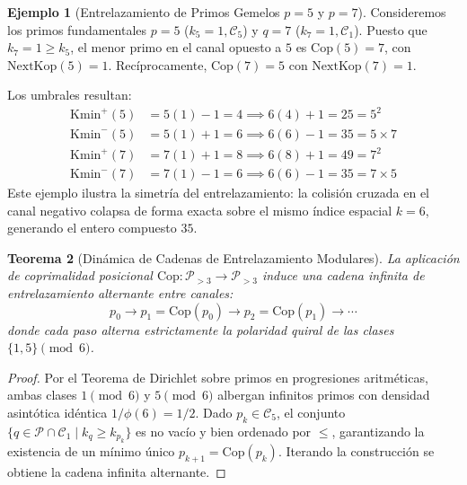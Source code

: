 \documentclass{article}
\numberwithin{equation}{section}
\theoremstyle{plain}
\newtheorem{theorem}{Teorema}[section]
\theoremstyle{definition}
\newtheorem{example}[theorem]{Ejemplo}
\begin{document}
\begin{example}[Entrelazamiento de Primos Gemelos $p=5$ y $p=7$]
Consideremos los primos fundamentales $p=5$ ($k_5 = 1, \mathcal{C}_5$) y $q=7$ ($k_7 = 1, \mathcal{C}_1$). 
Puesto que $k_7 = 1 \ge k_5$, el menor primo en el canal opuesto a $5$ es $\mathrm{Cop}(5) = 7$, con $\mathrm{NextKop}(5) = 1$. Recíprocamente, $\mathrm{Cop}(7) = 5$ con $\mathrm{NextKop}(7) = 1$.

Los umbrales resultan:
\begin{align}
\mathrm{Kmin}^+(5) &= 5(1) - 1 = 4 \implies 6(4) + 1 = 25 = 5^2 \nonumber \\
\mathrm{Kmin}^-(5) &= 5(1) + 1 = 6 \implies 6(6) - 1 = 35 = 5 \times 7 \nonumber \\
\mathrm{Kmin}^+(7) &= 7(1) + 1 = 8 \implies 6(8) + 1 = 49 = 7^2 \nonumber \\
\mathrm{Kmin}^-(7) &= 7(1) - 1 = 6 \implies 6(6) - 1 = 35 = 7 \times 5 \nonumber
\end{align}
Este ejemplo ilustra la simetría del entrelazamiento: la colisión cruzada en el canal negativo colapsa de forma exacta sobre el mismo índice espacial $k = 6$, generando el entero compuesto $35$.
\end{example}

\begin{theorem}[Dinámica de Cadenas de Entrelazamiento Modulares]
\label{thm:simetria-entrelazamiento}
La aplicación de coprimalidad posicional $\mathrm{Cop}: \mathcal{P}_{>3} \to \mathcal{P}_{>3}$ induce una cadena infinita de entrelazamiento alternante entre canales:
\begin{equation}
p_0 \longrightarrow p_1 = \mathrm{Cop}(p_0) \longrightarrow p_2 = \mathrm{Cop}(p_1) \longrightarrow \cdots
\end{equation}
donde cada paso alterna estrictamente la polaridad quiral de las clases $\{1, 5\} \pmod 6$.
\end{theorem}

\begin{proof}
Por el Teorema de Dirichlet sobre primos en progresiones aritméticas, ambas clases $1 \pmod 6$ y $5 \pmod 6$ albergan infinitos primos con densidad asintótica idéntica $1/\phi(6) = 1/2$. Dado $p_k \in \mathcal{C}_5$, el conjunto $\{q \in \mathcal{P} \cap \mathcal{C}_1 \mid k_q \ge k_{p_k}\}$ es no vacío y bien ordenado por $\le$, garantizando la existencia de un mínimo único $p_{k+1} = \mathrm{Cop}(p_k)$. Iterando la construcción se obtiene la cadena infinita alternante.
\end{proof}
\end{document}
